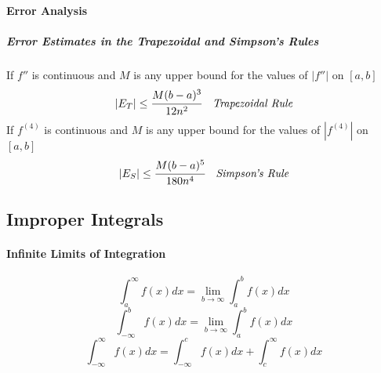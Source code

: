 \documentclass{article}
\begin{document}
            \paragraph{Error Analysis}
                \subparagraph{Error Estimates in the Trapezoidal and Simpson's Rules}
                If $f''$ is continuous and $M$ is any upper bound for the values of $|f''|$ on $[a,b]$
                \[|E_T|\le\cfrac{M(b-a)^3}{12n^2}\quad \textit{Trapezoidal Rule}\]
                If $f^{(4)}$ is continuous and $M$ is any upper bound for the values of $|f^{(4)}|$ on $[a,b]$ 
                \[|E_S|\le\cfrac{M(b-a)^5}{180n^4}\quad \textit{Simpson's Rule}\]
        \subsection{Improper Integrals}
            \paragraph{Infinite Limits of Integration}
            \[\int_a^\infty f(x)dx=\lim\limits_{b\to \infty}\int_a^b f(x)dx\]
            \[\int_{-\infty}^bf(x)dx=\lim\limits_{b\to \infty}\int_a^b f(x)dx\]
            \[\int_{-\infty}^\infty f(x)dx=\int_{-\infty}^cf(x)dx+\int_c^\infty f(x) dx\]
\end{document}
